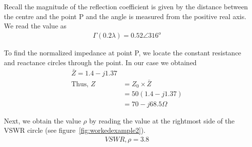 \begin{exmp}
Recall the magnitude of the reflection coefficient is given by the distance between the centre and the point P and the angle is measured from the positive real axis. We read the value as
\begin{align*}
\Gamma(0.2\lambda) = 0.52\angle316^o
\end{align*}

To find the normalized impedance at point P, we locate the constant resistance and reactance circles through the point. In our case we obtained
\begin{align*}
\bar{Z}=1.4-j1.37\\
\text{Thus, }Z &=Z_{0}\times\bar{Z}\\
&= 50(1.4-j1.37)\\
&= 70-j68.5\varOmega
\end{align*}

Next, we obtain the value $\rho$ by reading the value at the rightmost side of the VSWR circle (see figure~\ref{fig:workedexample2}).
\begin{align*}
VSWR, \rho = 3.8
\end{align*}
\end{exmp}

